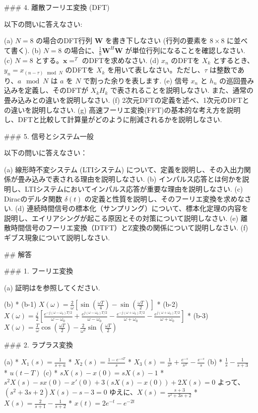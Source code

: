 \documentclass{ltjsarticle}
\begin{document}
### 4. 離散フーリエ変換 (DFT)

以下の問いに答えなさい:

(a) $N=8$ の場合のDFT行列 $\mathbf{W}$ を書き下しなさい (行列の要素を $8 \times 8$ に並べて書く).
(b) $N=8$ の場合に、$\frac{1}{8} \mathbf{W}^H \mathbf{W}$ が単位行列になることを確認しなさい.
(c) $N=8$ とする。$\mathbf{x} =^T$ のDFTを求めなさい.
(d) $x_n$ のDFTを $X_k$ とするとき、$y_n = x_{(n-\tau) \mod N}$ のDFTを $X_k$ を用いて表しなさい。ただし、$\tau$ は整数であり、$a \mod N$ は $a$ を $N$ で割った余りを表します.
(e) 信号 $x_n$ と $h_n$ の巡回畳み込みを定義し、そのDFTが $X_k H_k$ で表されることを説明しなさい. また、通常の畳み込みとの違いを説明しなさい.
(f) 2次元DFTの定義を述べ、1次元のDFTとの違いを説明しなさい.
(g) 高速フーリエ変換(FFT)の基本的な考え方を説明し、DFTと比較して計算量がどのように削減されるかを説明しなさい.

### 5. 信号とシステム一般

以下の問いに答えなさい：

(a) 線形時不変システム (LTIシステム) について、定義を説明し、その入出力関係が畳み込みで表される理由を説明しなさい.
(b) インパルス応答とは何かを説明し、LTIシステムにおいてインパルス応答が重要な理由を説明しなさい.
(c) Diracのデルタ関数 $\delta(t)$ の定義と性質を説明し、そのフーリエ変換を求めなさい.
(d) 連続時間信号の標本化（サンプリング）について、標本化定理の内容を説明し、エイリアシングが起こる原因とその対策について説明しなさい.
(e) 離散時間信号のフーリエ変換（DTFT）とZ変換の関係について説明しなさい.
(f) ギブス現象について説明しなさい.

## 解答

### 1. フーリエ変換

(a) 証明はを参照してください.

(b)
*  (b-1) $X(\omega) = \frac{2}{\omega}\left[\sin\left(\frac{\omega T}{4}\right) - \sin\left(\frac{\omega T}{2}\right)\right]$
*  (b-2) $X(\omega) = \frac{j}{2}\left[\frac{e^{-j(\omega - \omega_0)T/2}}{\omega - \omega_0} + \frac{e^{j(\omega - \omega_0)T/2}}{\omega - \omega_0} - \frac{e^{-j(\omega + \omega_0)T/2}}{\omega + \omega_0} - \frac{e^{j(\omega + \omega_0)T/2}}{\omega + \omega_0}\right]$
*   (b-3) $X(\omega) = \frac{T}{\omega} \cos\left(\frac{\omega T}{2}\right) - \frac{2}{\omega^2} \sin\left(\frac{\omega T}{2}\right)$

### 2. ラプラス変換

(a)
    *   $X_1(s) = \frac{1}{s+a}$
    *  $X_2(s) = \frac{1-e^{-sT}}{s}$
    *  $X_3(s) = \frac{1}{s^2} + \frac{e^{-s}}{s^2} - \frac{e^{-s}}{s}$
(b)
    *   $\frac{1}{s} - \frac{1}{s+3}$ 
    *   $u(t-T)$
(c)
    *   $sX(s) - x(0) = sX(s) - 1$
    *   $s^2X(s) - sx(0) - x'(0) + 3(sX(s) - x(0)) + 2X(s) = 0$ よって、$(s^2 + 3s + 2)X(s) - s - 3 = 0$ ゆえに、$X(s) = \frac{s+3}{s^2 + 3s + 2}$
    *   $X(s) = \frac{2}{s+1} - \frac{1}{s+2}$
    *   $x(t) = 2e^{-t} - e^{-2t}$
\end{document}
